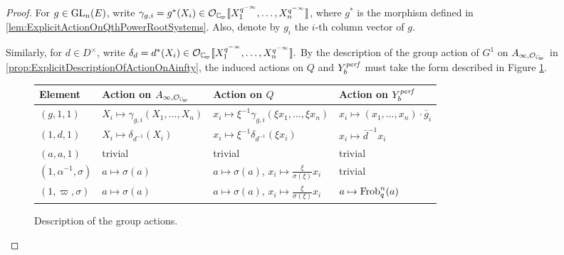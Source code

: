 \documentclass[../main.tex]{subfiles}
\begin{document}
\begin{proof}
For $g \in \operatorname{GL}_n(E)$, write $\gamma_{g,i} = g^*(X_i) 
\in \cO_\Cp \llbr X_1^{q^{-\infty}}, \dots, X_n^{q^{-\infty}} \rrbr$, where 
$g^*$ is the morphism defined in \cref{lem:ExplicitActionOnQthPowerRootSystems}.
 Also, denote by $g_i$ the $i$-th column vector of $g$.

Similarly, for $d \in D^\times$, write $\delta_d = d^*(X_i) \in \cO_\Cp\llbr
X_1^{q^{-\infty}}, \dots, X_n^{q^{-\infty}} \rrbr.$
By the description of the group action of $G^1$ on $A_{\infty, \cO_\Cp}$
in \cref{prop:ExplicitDescriptionOfActionOnAinfty}, the induced
actions on $Q$ and $Y_b^{\mathit{perf}}$ must take the form described in Figure
\ref{fig:TableOfGroupActionsOnModels}. 

\begin{figure}[H] 
\centering
\begin{center}
\begin{tabularx} {0.95\textwidth} { 
  |>{\centering\arraybackslash}X ||>{\centering\arraybackslash}X
  |>{\centering\arraybackslash}X |>{\centering\arraybackslash}X | }
 \hline
 Element & Action on $A_{\infty,\cO_\Cp}$ & Action on $Q$ & Action on
 $Y_b^{\mathit{perf}}$ \\ [0.5ex] 
 \hline\hline
 $(g,1,1)$ & $X_i \mapsto \gamma_{g,i}(X_1, \dots, X_n)$ & $x_i \mapsto
 \xi^{-1}\gamma_{g,i}(\xi x_1, \dots, \xi x_n)$ & $x_i \mapsto
 (x_1, \dots, x_n)\cdot\bar g_i$\\ 
 \hline
$(1,d,1)$ & $X_i \mapsto \delta_{d^{-1}}(X_i)$ & $x_i \mapsto \xi^{-1}
\delta_{d^{-1}}(\xi x_i)$ & $x_i \mapsto \bar d^{-1} x_i$ \\
 \hline
 $(a,a,1)$ & trivial & trivial & trivial \\
 \hline
 $(1, \alpha^{-1}, \sigma)$ & $a \mapsto \sigma(a)$& $a \mapsto \sigma(a)$, $x_i \mapsto  \tfrac{\xi}{\sigma(\xi)} x_i$ & trivial \\
 \hline
 $(1, \varpi, \sigma)$ & $a \mapsto \sigma(a)$& $a \mapsto \sigma(a)$, $x_i \mapsto
 \tfrac{\xi}{\sigma(\xi)} x_i$ & $a
 \mapsto \mathrm{Frob}_q^n(a)$ \\ [1ex] 
 \hline
\end{tabularx}
\end{center}
\caption{Description of the group actions.}
\label{fig:TableOfGroupActionsOnModels}
\end{figure}


\end{proof}
\end{document}
